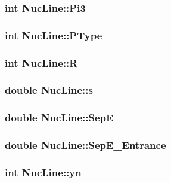 \subsubsection{\setlength{\rightskip}{0pt plus 5cm}int \bf{Nuc\-Line::Pi3}}\label{structNucLine_6b7126f87a44fef4082f76a42728d941}


\subsubsection{\setlength{\rightskip}{0pt plus 5cm}int \bf{Nuc\-Line::PType}}\label{structNucLine_e0be9e2d02ea73d69f4c5fca47b96572}


\subsubsection{\setlength{\rightskip}{0pt plus 5cm}int \bf{Nuc\-Line::R}}\label{structNucLine_06e1f068fb52cb257e6149d73b808519}


\subsubsection{\setlength{\rightskip}{0pt plus 5cm}double \bf{Nuc\-Line::s}}\label{structNucLine_43cb3ae792d84af56b26f52260279ae8}


\subsubsection{\setlength{\rightskip}{0pt plus 5cm}double \bf{Nuc\-Line::Sep\-E}}\label{structNucLine_12d6ff627c5fc8d0b7bdc7b159f99637}


\subsubsection{\setlength{\rightskip}{0pt plus 5cm}double \bf{Nuc\-Line::Sep\-E\_\-Entrance}}\label{structNucLine_0096d6c18a22103e0f299e1a57cd8535}


\subsubsection{\setlength{\rightskip}{0pt plus 5cm}int \bf{Nuc\-Line::yn}}\label{structNucLine_dd211a31f3ce42f553cde345a0155a66}


